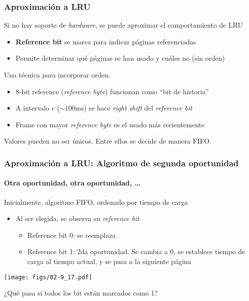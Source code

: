 \documentclass[letter]{beamer}
\begin{document}
\begin{frame}
  \frametitle{Aproximación a LRU}

  Si no hay soporte de {\em hardware}, se puede aproximar el comportamiento de LRU
  
  \begin{itemize}
    \item {\bf Reference bit} se marca para indicar páginas referenciadas
    \item Permite determinar qué páginas se han usado y cuáles no (sin orden)
  \end{itemize}

  Una técnica para incorporar orden:
  \begin{itemize}
    \item 8-bit reference ({\em reference byte}) funcionan como ``bit de historia''
    \item A intervalo $r$ ($\sim 100$ms) se hace {\em right shift}
          del {\em reference bit}
    \item Frame con mayor {\em reference byte} es el usado más recientemente    
  \end{itemize}
  
  Valores pueden no ser únicos. Entre ellos se decide de manera FIFO.
  
\end{frame}
\begin{frame}
  \frametitle{Aproximación a LRU: Algoritmo de segunda oportunidad}
  \framesubtitle{Otra oportunidad, otra oportunidad, \ldots}

  Inicialmente, algoritmo FIFO, ordenado por tiempo de carga
  \begin{itemize}
    \item Al ser elegida, se observa su {\em reference bit}
      \begin{itemize}
        \item Reference bit 0: se reemplaza
        \item Reference bit 1: 2da oportunidad. Se cambia a 0, se establece tiempo de carga al tiempo actual, 
              y se pasa a la siguiente página
      \end{itemize}
  \end{itemize}

  \begin{center}
    \texttt{[image: figs/02-9\_17.pdf]}
  \end{center}
  
  ¿Qué pasa si todos los bit están marcados como 1?

\end{frame}
\end{document}
